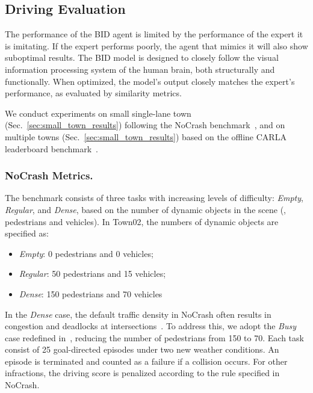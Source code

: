 \subsection{Driving Evaluation}
\label{sec:Metrics}
\hspace{1pc}The performance of the BID agent is limited by the performance of the expert it is imitating. 
If the expert performs poorly, the agent that mimics it will also show suboptimal results. 
The BID model is designed to closely follow the visual information processing system of the human brain, both structurally and functionally. 
When optimized, the model’s output closely matches the expert’s performance, as evaluated by similarity metrics.


We conduct experiments on small single-lane town (Sec.~\ref{sec:small_town_results}) following the NoCrash benchmark~\cite{Zhang:2021,Hu:2022}, and on multiple towns (Sec.~\ref{sec:small_town_results}) based on the offline CARLA leaderboard benchmark~\cite{Zhang:2021,Hu:2022}. 


\subsubsection{NoCrash Metrics.}\label{nocrash_metrics}

\hspace{1pc}The benchmark consists of three tasks with increasing levels of difficulty: \emph{Empty}, \emph{Regular}, and \emph{Dense}, based on the number of dynamic objects in the scene ({\ie}, pedestrians and vehicles). 
In Town02, the numbers of dynamic objects are specified as:
\begin{itemize}
	\item \emph{Empty}: 0 pedestrians and 0 vehicles;
	\item \emph{Regular}: 50 pedestrians and 15 vehicles;
	\item \emph{Dense}: 150 pedestrians and 70 vehicles
\end{itemize}
In the \emph{Dense} case, the default traffic density in NoCrash often results in congestion and deadlocks at intersections~\cite{Zhang:2021}. 
To address this, we adopt the \emph{Busy} case redefined in~\cite{Zhang:2021}, reducing the number of pedestrians from 150 to 70. 
Each task consist of 25 goal-directed episodes under two new weather conditions.
An episode is terminated and counted as a failure if a collision occurs. 
For other infractions, the driving score is penalized according to the rule specified in NoCrash. 


